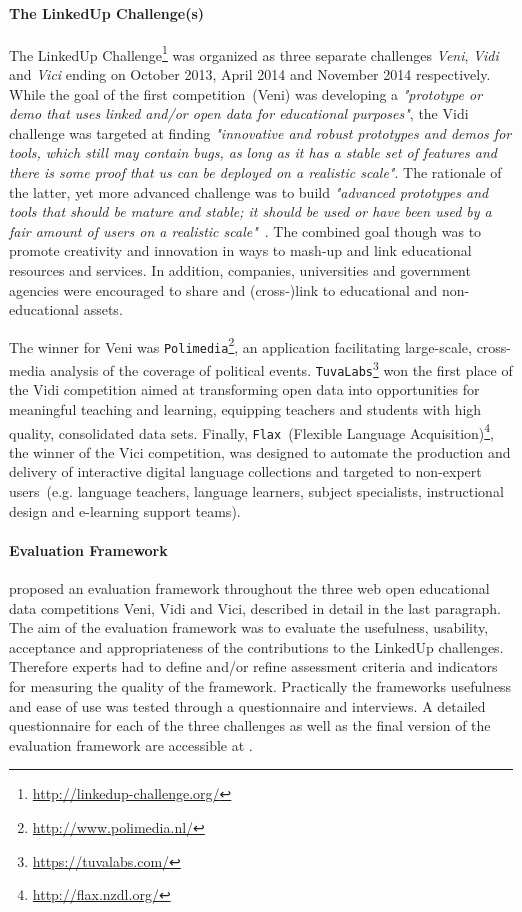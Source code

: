 \documentclass{article}
\begin{document}
\paragraph{The LinkedUp Challenge(s)}
The LinkedUp Challenge\footnote{\url{http://linkedup-challenge.org/}} was organized as three separate challenges \textit{Veni}, \textit{Vidi} and \textit{Vici} ending on October 2013, April 2014 and November 2014 respectively. While the goal of the first competition~(Veni) was developing a \textit{"prototype or demo that uses linked and/or open data for educational purposes"}, the Vidi challenge was targeted at finding \textit{"innovative and robust prototypes and demos for tools, which still may contain bugs, as long as it has a stable set of features and there is some proof that us can be deployed on a realistic scale"}. The rationale of the latter, yet more advanced challenge was to build \textit{"advanced prototypes and tools that should be mature and stable; it should be used or have been used by a fair amount of users on a realistic scale"}~\cite{herder_linkedup_2014}. 
The combined goal though was to promote creativity and innovation in ways to mash-up and link educational resources and services. In addition, companies, universities and government agencies were encouraged to share and (cross-)link to educational and non-educational assets. 

The winner for Veni was \texttt{Polimedia}\footnote{\url{http://www.polimedia.nl/}}, an application facilitating large-scale, cross-media analysis of the coverage of political events.
\texttt{TuvaLabs}\footnote{\url{https://tuvalabs.com/}} won the first place of the Vidi competition aimed at transforming open data into opportunities for meaningful teaching and learning, equipping teachers and students with high quality, consolidated data sets. Finally, \texttt{Flax}~(Flexible Language Acquisition)\footnote{\url{http://flax.nzdl.org/}},
the winner of the Vici competition, was designed to automate the production and delivery of interactive digital language collections and targeted to non-expert users~(e.g. language teachers, language learners, subject specialists, instructional design and e-learning support teams). 

\paragraph{Evaluation Framework}
\cite{drachsler_final_2014} proposed an evaluation framework throughout the three web open educational data competitions Veni, Vidi and Vici, described in detail in the last paragraph. The aim of the evaluation framework was to evaluate the usefulness, usability, acceptance and appropriateness of the contributions to the LinkedUp challenges. Therefore experts had to define and/or refine assessment criteria and indicators for measuring the quality of the framework. Practically the frameworks usefulness and ease of use was tested through a questionnaire and interviews. A detailed questionnaire for each of the three challenges as well as the final version of the evaluation framework are accessible at \cite{drachsler_final_2014}. 
\end{document}
